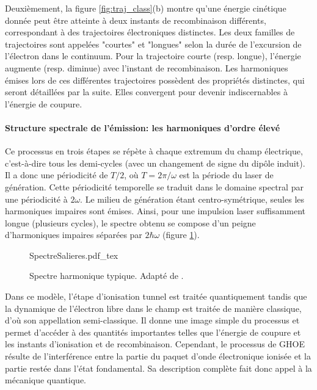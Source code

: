 Deuxièmement, la figure \ref{fig:traj_class}(b) montre qu'une énergie cinétique donnée peut être atteinte à deux instants de recombinaison différents, correspondant à des trajectoires électroniques distinctes. Les deux familles de trajectoires sont appelées "courtes" et "longues" selon la durée de l'excursion de l'électron dans le continuum. Pour la trajectoire courte (resp. longue), l'énergie augmente (resp. diminue) avec l'instant de recombinaison. Les harmoniques émises lors de ces différentes trajectoires possèdent des propriétés distinctes, qui seront détaillées par la suite. Elles convergent pour devenir indiscernables à l'énergie de coupure.

\paragraph{Structure spectrale de l'émission: les harmoniques d'ordre élevé} Ce processus en trois étapes se répète à chaque extremum du champ électrique, c'est-à-dire tous les demi-cycles (avec un changement de signe du dipôle induit). Il a donc une périodicité de $T/2$, où $T = 2 \pi /\omega$ est la période du laser de génération. Cette périodicité temporelle se traduit dans le domaine spectral par une périodicité à $2 \omega$. Le milieu de génération étant centro-symétrique, seules les harmoniques impaires sont émises. Ainsi, pour une impulsion laser suffisamment longue (plusieurs cycles), le spectre obtenu se compose d'un peigne d'harmoniques impaires séparées par $2 \hbar \omega$ (figure \ref{fig:SpectreSalieres}).

\begin{figure}
\centering
\def\svgwidth{0.6\columnwidth}
{SpectreSalieres.pdf_tex}
\caption{Spectre harmonique typique. Adapté de .}
\label{fig:SpectreSalieres}
\end{figure}

Dans ce modèle, l'étape d'ionisation tunnel est traitée quantiquement tandis que la dynamique de l'électron libre dans le champ est traitée de manière classique, d'où  son appellation semi-classique. Il donne une image simple du processus et permet d'accéder à des quantités importantes telles que l'énergie de coupure et les instants d'ionisation et de recombinaison. Cependant, le processus de GHOE résulte de l'interférence entre la partie du paquet d'onde électronique ionisée et la partie restée dans l'état fondamental. Sa description complète fait donc appel à la mécanique quantique.

